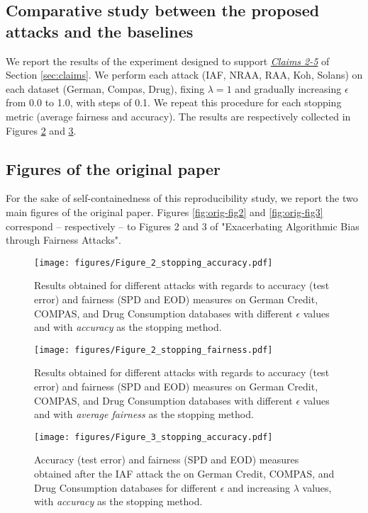 \subsection{Comparative study between the proposed attacks and the baselines}\label{app:comparative}
We report the results of the experiment designed to support \hyperlink{claim-2}{\textit{Claims 2-5}} of Section \ref{sec:claims}. We perform each attack (IAF, NRAA, RAA, Koh, Solans) on each dataset (German, Compas, Drug), fixing $\lambda = 1$ and gradually increasing $\epsilon$ from 0.0 to 1.0, with steps of 0.1. We repeat this procedure for each stopping metric (average fairness and accuracy). The results are respectively collected in Figures \ref{fig:2-stop-fairness} and \ref{fig:3-stop-accuracy}.

\subsection{Figures of the original paper}\label{app:orig-figs}
For the sake of self-containedness of this reproducibility study, we report the two main figures of the original paper. Figures \ref{fig:orig-fig2} and \ref{fig:orig-fig3} correspond -- respectively -- to Figures 2 and 3 of "Exacerbating Algorithmic Bias through Fairness Attacks".
\clearpage

\begin{figure}
    \centering
    \texttt{[image: figures/Figure\_2\_stopping\_accuracy.pdf]}
    \caption{Results obtained for different attacks with regards to accuracy (test error) and fairness (SPD and EOD) measures on German Credit, COMPAS, and Drug Consumption databases with different $\epsilon$ values and with \textit{accuracy} as the stopping method.}
    \label{fig:2-stop-accuracy}
\end{figure}

\begin{figure}
    \centering
    \texttt{[image: figures/Figure\_2\_stopping\_fairness.pdf]}
    \caption{Results obtained for different attacks with regards to accuracy (test error) and fairness (SPD and EOD) measures on German Credit, COMPAS, and Drug Consumption databases with different $\epsilon$ values and with \textit{average fairness} as the stopping method.}
    \label{fig:2-stop-fairness}
\end{figure}

\begin{figure}
    \centering
    \texttt{[image: figures/Figure\_3\_stopping\_accuracy.pdf]}
    \caption{Accuracy (test error) and fairness (SPD and EOD) measures obtained after the IAF attack the on German Credit, COMPAS, and Drug Consumption databases for different $\epsilon$ and increasing $\lambda$ values,  with \textit{accuracy} as the stopping method.}
    \label{fig:3-stop-accuracy}
\end{figure}

